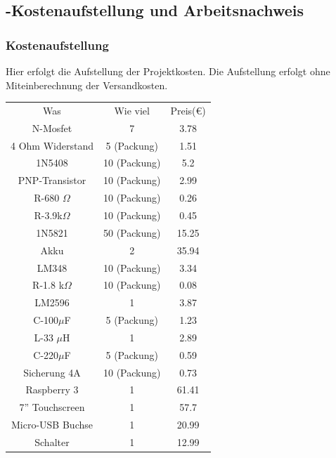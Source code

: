 \documentclass[12pt,a4paper]{article}
\begin{document}
 \subsection{-Kostenaufstellung und Arbeitsnachweis} 
 \subsubsection{Kostenaufstellung}
 Hier erfolgt die Aufstellung der Projektkosten. Die Aufstellung erfolgt ohne Miteinberechnung der Versandkosten. \\
  
	\begin{center}
	
	
		\begin{tabular}{|c|c|c|}
		\hline
		 \sc Was & \sc Wie viel &  \sc Preis($\euro$)\\
		\specialrule{2.5pt}{1pt}{1pt}
		N-Mosfet			&		7							&		3.78				\\
		\hline
		4 Ohm Widerstand	&	5 (Packung)				&		1.51				\\
		\hline
		1N5408	 			& 10 (Packung)			&		5.2		\\
		\hline
		PNP-Transistor	&	10 (Packung)			&		2.99	\\
		\hline
		R-680 $\Omega$&	10 (Packung)			&		0.26		\\
		\hline
		R-3.9k$\Omega$	& 10 (Packung)			& 0.45		\\
		\hline
		1N5821				& 50 (Packung)			&	15.25		\\
		\hline
		Akku					&	2								& 35.94				\\
			\hline
		LM348					&		10 (Packung)		& 3.34				\\
			\hline
		R-1.8 k$\Omega$& 10 (Packung)			& 0.08				\\
			\hline
		LM2596				&	1								&	3.87			\\
			\hline
		C-100$\mu$F		&	5 (Packung)				&	1.23			\\
			\hline
		L-33 $\mu$H		&	1								& 2.89				\\
			\hline
		C-220$\mu$F		&	5 (Packung)				&	0.59			\\
			\hline
		Sicherung 4A		&	10 (Packung)			&	0.73			\\
			\hline
		Raspberry 3		&	1								&	61.41			\\
			\hline
		7'' Touchscreen	&	1								&	57.7			\\
			\hline
		Micro-USB Buchse& 1									&	 20.99			\\
			\hline
		Schalter				&	1								&			12.99	\\

\end{tabular}
\end{center}
\end{document}
